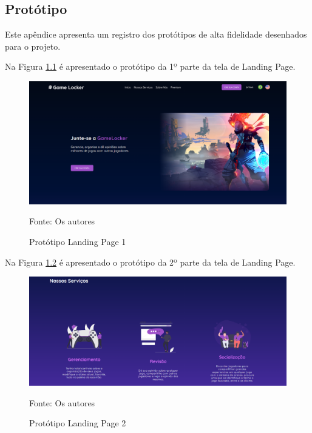 
\begin{apendicesenv}

\partapendices
\chapter{Protótipo}
\label{apendice-prototipo}

Este apêndice apresenta um registro dos protótipos de alta fidelidade desenhados para o projeto.

Na Figura \ref{prototipoLandingPage} é apresentado o protótipo da 1º parte da tela de Landing Page.

\begin{figure}[H]
	\centering
	\includegraphics[width=1\textwidth,keepaspectratio]{./imagens/PrototipoLandingPage.png}
	\caption{Protótipo Landing Page 1}
	Fonte: Os autores
    \label{prototipoLandingPage}
\end{figure}
\pagebreak

Na Figura \ref{prototipoLandingPage2} é apresentado o protótipo da 2º parte da tela de Landing Page.

\begin{figure}[H]
	\centering
	\includegraphics[width=1\textwidth,keepaspectratio]{./imagens/PrototipoLandingPage2.png}
	\caption{Protótipo Landing Page 2}
	Fonte: Os autores
    \label{prototipoLandingPage2}
\end{figure}


\end{apendicesenv}
